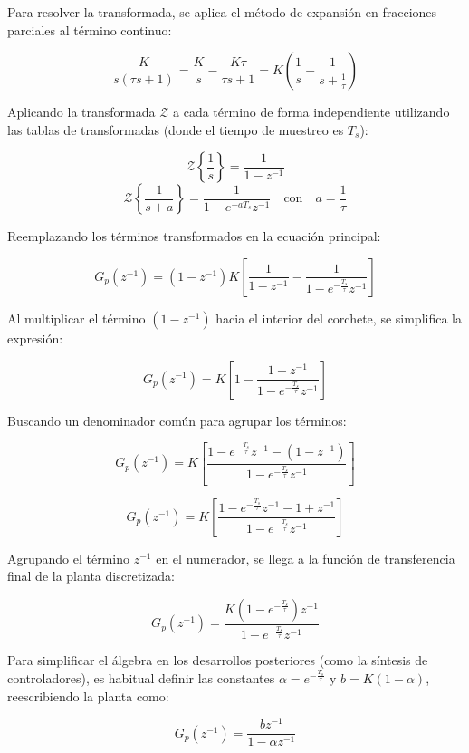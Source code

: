 Para resolver la transformada, se aplica el método de expansión en fracciones parciales al término continuo:

\[
  \frac{K}{s(\tau s + 1)} = \frac{K}{s} - \frac{K\tau}{\tau s + 1} = K \left( \frac{1}{s} - \frac{1}{s + \frac{1}{\tau}} \right)
\]

Aplicando la transformada $\mathcal{Z}$ a cada término de forma independiente utilizando las tablas de transformadas (donde el tiempo de muestreo es $T_s$):

\[
  \mathcal{Z} \left\{ \frac{1}{s} \right\} = \frac{1}{1 - z^{-1}}
\]
\[
  \mathcal{Z} \left\{ \frac{1}{s + a} \right\} = \frac{1}{1 - e^{-aT_s}z^{-1}} \quad \text{con} \quad a = \frac{1}{\tau}
\]

Reemplazando los términos transformados en la ecuación principal:

\[
  G_p(z^{-1}) = (1 - z^{-1}) K \left[ \frac{1}{1 - z^{-1}} - \frac{1}{1 - e^{-\frac{T_s}{\tau}}z^{-1}} \right]
\]

Al multiplicar el término $(1 - z^{-1})$ hacia el interior del corchete, se simplifica la expresión:

\[
  G_p(z^{-1}) = K \left[ 1 - \frac{1 - z^{-1}}{1 - e^{-\frac{T_s}{\tau}}z^{-1}} \right]
\]

Buscando un denominador común para agrupar los términos:

\[
  G_p(z^{-1}) = K \left[ \frac{1 - e^{-\frac{T_s}{\tau}}z^{-1} - (1 - z^{-1})}{1 - e^{-\frac{T_s}{\tau}}z^{-1}} \right]
\]

\[
  G_p(z^{-1}) = K \left[ \frac{1 - e^{-\frac{T_s}{\tau}}z^{-1} - 1 + z^{-1}}{1 - e^{-\frac{T_s}{\tau}}z^{-1}} \right]
\]

Agrupando el término $z^{-1}$ en el numerador, se llega a la función de transferencia final de la planta discretizada:

\begin{equation}
  G_p(z^{-1}) = \frac{K \left( 1 - e^{-\frac{T_s}{\tau}} \right) z^{-1}}{1 - e^{-\frac{T_s}{\tau}}z^{-1}}
\end{equation}

Para simplificar el álgebra en los desarrollos posteriores (como la síntesis de controladores), es habitual definir las constantes $\alpha = e^{-\frac{T_s}{\tau}}$ y $b = K(1 - \alpha)$, reescribiendo la planta como:

\begin{equation}
  G_p(z^{-1}) = \frac{b z^{-1}}{1 - \alpha z^{-1}}
\end{equation}
\clearpage
